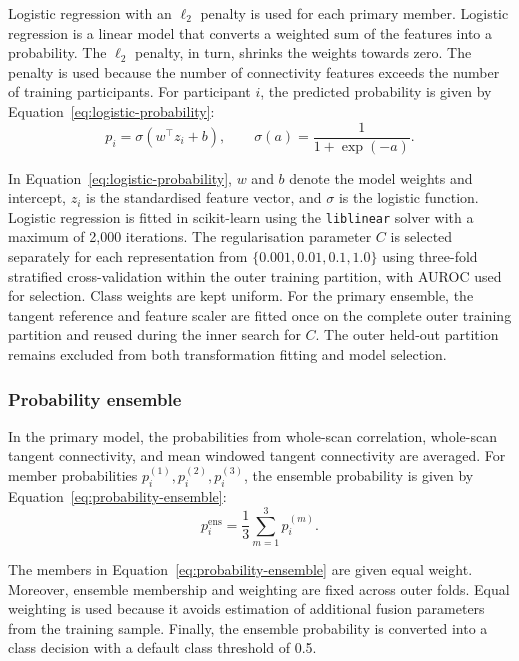 Logistic regression with an $\ell_2$ penalty is used for each primary member. Logistic
regression is a linear model that converts a weighted sum of the features into a
probability. The $\ell_2$ penalty, in turn, shrinks the weights towards zero. The penalty
is used because the number of connectivity features exceeds the number of training
participants. For participant $i$, the predicted probability is given by
Equation~\eqref{eq:logistic-probability}:
\begin{equation}
p_i
=
\sigma(w^\top z_i+b),
\qquad
\sigma(a)
=
\frac{1}{1+\exp(-a)}.
\label{eq:logistic-probability}
\end{equation}

In Equation~\eqref{eq:logistic-probability}, $w$ and $b$ denote the model weights and intercept, $z_i$ is
the standardised feature vector, and $\sigma$ is the logistic function. Logistic regression
is fitted in scikit-learn \citep{Pedregosaetal2011} using the \texttt{liblinear} solver
with a maximum of 2,000 iterations. The regularisation parameter $C$ is selected separately
for each representation from $\{0.001,0.01,0.1,1.0\}$ using three-fold stratified
cross-validation within the outer training partition, with AUROC used for selection. Class
weights are kept uniform. For the primary ensemble, the tangent reference and feature
scaler are fitted once on the complete outer training partition and reused during the inner
search for $C$. The outer held-out partition remains excluded from both transformation
fitting and model selection.

\subsubsection{Probability ensemble}
\label{subsubsec:probability-ensemble}

In the primary model, the probabilities from whole-scan correlation, whole-scan tangent
connectivity, and mean windowed tangent connectivity are averaged. For member
probabilities $p_i^{(1)},p_i^{(2)},p_i^{(3)}$, the ensemble probability is given by
Equation~\eqref{eq:probability-ensemble}:
\begin{equation}
p_i^{\mathrm{ens}}
=
\frac{1}{3}
\sum_{m=1}^{3}p_i^{(m)}.
\label{eq:probability-ensemble}
\end{equation}

The members in Equation~\eqref{eq:probability-ensemble} are given equal weight. Moreover, ensemble
membership and weighting are fixed across outer folds. Equal weighting is used because it
avoids estimation of additional fusion parameters from the training sample. Finally, the
ensemble probability is converted into a class decision with a default class threshold of
0.5.

